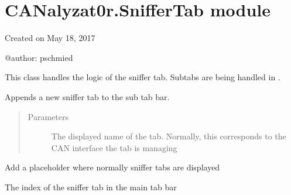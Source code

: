 \documentclass[letterpaper,10pt,english]{sphinxmanual}
\begin{document}
\section{CANalyzat0r.SnifferTab module}
\label{\detokenize{src:canalyzat0r-sniffertab-module}}\label{\detokenize{src:module-src.SnifferTab}}
Created on May 18, 2017

@author: pschmied

\begin{fulllineitems}
\label{\detokenize{src:src.SnifferTab.SnifferTab}}
This class handles the logic of the sniffer tab.
Subtabs are being handled in {\hyperref[\detokenize{src:src.SnifferTabElement.SnifferTabElement}]{}}.

\begin{fulllineitems}
\label{\detokenize{src:src.SnifferTab.SnifferTab.addSniffer}}
Appends a new sniffer tab to the sub tab bar.
\begin{quote}\begin{description}
\item[{Parameters}] \leavevmode
{} \textendash{} The displayed name of the tab. Normally, this corresponds to the
CAN interface the tab is managing

\end{description}\end{quote}

\end{fulllineitems}


\begin{fulllineitems}
\label{\detokenize{src:src.SnifferTab.SnifferTab.clearAndAddPlaceholder}}
Add a placeholder where normally sniffer tabs are displayed

\end{fulllineitems}


\begin{fulllineitems}
\label{\detokenize{src:src.SnifferTab.SnifferTab.indexInMainTabBar}}
The index of the sniffer tab in the main tab bar


\end{fulllineitems}
\end{fulllineitems}
\end{document}
